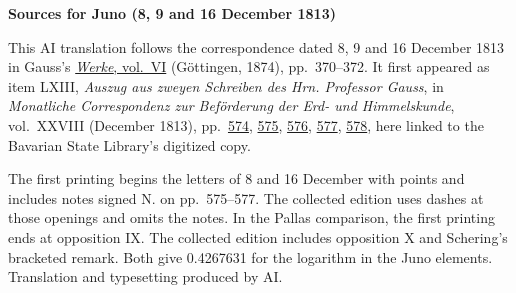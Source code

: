 \clearpage\thispagestyle{empty}
\begin{center}\textbf{Sources for Juno (8, 9 and 16 December 1813)}\end{center}
\noindent This AI translation follows the correspondence dated 8, 9 and 16 December 1813 in Gauss’s \href{https://gdz.sub.uni-goettingen.de/id/PPN236007467}{\textit{Werke}, vol.~VI} (Göttingen, 1874), pp.~370--372. It first appeared as item LXIII, \textit{Auszug aus zweyen Schreiben des Hrn. Professor Gauss}, in \textit{Monatliche Correspondenz zur Beförderung der Erd- und Himmelskunde}, vol.~XXVIII (December 1813), pp.~\href{https://api.digitale-sammlungen.de/iiif/image/v2/bsb10538617_00590/full/1600,/0/default.jpg}{574}, \href{https://api.digitale-sammlungen.de/iiif/image/v2/bsb10538617_00591/full/1600,/0/default.jpg}{575}, \href{https://api.digitale-sammlungen.de/iiif/image/v2/bsb10538617_00592/full/1600,/0/default.jpg}{576}, \href{https://api.digitale-sammlungen.de/iiif/image/v2/bsb10538617_00593/full/1600,/0/default.jpg}{577}, \href{https://api.digitale-sammlungen.de/iiif/image/v2/bsb10538617_00594/full/1600,/0/default.jpg}{578}, here linked to the Bavarian State Library’s digitized copy.
\par\smallskip\noindent The first printing begins the letters of 8 and 16 December with points and includes notes signed N. on pp.~575--577. The collected edition uses dashes at those openings and omits the notes. In the Pallas comparison, the first printing ends at opposition IX. The collected edition includes opposition X and Schering’s bracketed remark. Both give 0.4267631 for the logarithm in the Juno elements. Translation and typesetting produced by AI.
\clearpage
